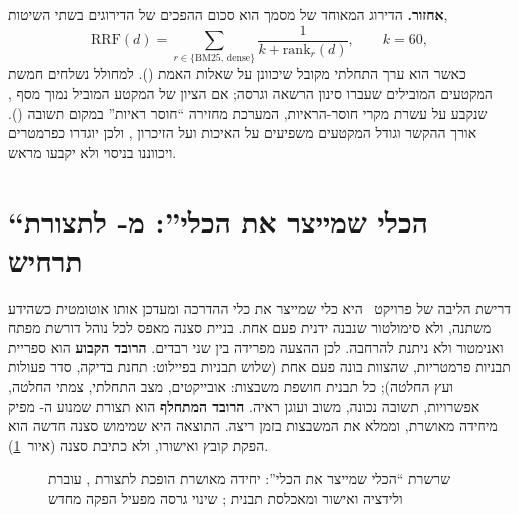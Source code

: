\textbf{אחזור.} הדירוג המאוחד של מסמך  הוא סכום ההפכים של הדירוגים בשתי השיטות,
\begin{equation}
  \mathrm{RRF}(d)=\sum_{r\in\{\mathrm{BM25},\,\mathrm{dense}\}}\frac{1}{k+\mathrm{rank}_r(d)},\qquad k=60,
\end{equation}
כאשר  הוא ערך התחלתי מקובל שיכוונן על שאלות האמת (). למחולל נשלחים חמשת המקטעים המובילים שעברו סינון הרשאה וגרסה; אם הציון של המקטע
המוביל נמוך מסף \mth{\tau}, שנקבע על עשרת מקרי חוסר-הראיות, המערכת מחזירה “חוסר ראיות” במקום תשובה (). אורך ההקשר וגודל המקטעים משפיעים
על האיכות ועל הזיכרון \cite{vladika2025context}, ולכן יוגדרו כפרמטרים ויכווננו בניסוי ולא יקבעו מראש.

\section{“הכלי שמייצר את הכלי”: מ- לתצורת תרחיש \threeDadj}\label{sec:solgen}
דרישת הליבה של פרויקט~ היא כלי שמייצר את כלי ההדרכה ומעדכן אותו אוטומטית כשהידע משתנה, ולא סימולטור שנבנה ידנית פעם אחת. בניית סצנה
\threeDadj{} מאפס לכל נוהל דורשת מפתח ואנימטור ולא ניתנת להרחבה. לכן ההצעה מפרידה בין שני רבדים. \textbf{הרובד הקבוע} הוא ספריית תבניות
\threeD{} פרמטריות, שהצוות בונה פעם אחת (שלוש תבניות בפיילוט: תחנת בדיקה, סדר פעולות ועץ החלטה); כל תבנית חושפת משבצות: אובייקטים, מצב התחלתי,
צמתי החלטה, אפשרויות, תשובה נכונה, משוב ועוגן ראיה. \textbf{הרובד המתחלף} הוא תצורת  שמנוע ה- מפיק מיחידה מאושרת, וממלא את
המשבצות בזמן ריצה. התוצאה היא שמימוש סצנה חדשה הוא הפקת קובץ ואישורו, ולא כתיבת סצנה (איור~\ref{fig:toolchain}).
\begin{figure}[!htbp]
\centering
{}
\caption{שרשרת “הכלי שמייצר את הכלי”: יחידה מאושרת הופכת לתצורת , עוברת ולידציה ואישור ומאכלסת תבנית \threeDadj{}; שינוי גרסה מפעיל הפקה מחדש}\label{fig:toolchain}
\end{figure}
